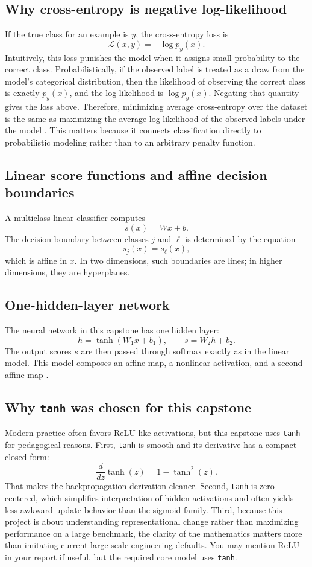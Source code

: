 \documentclass[11pt]{article}
\begin{document}
\subsection{Why cross-entropy is negative log-likelihood}

If the true class for an example is $y$, the cross-entropy loss is
\[
\mathcal{L}(x,y) = -\log p_y(x).
\]
Intuitively, this loss punishes the model when it assigns small probability to the correct class. Probabilistically, if the observed label is treated as a draw from the model's categorical distribution, then the likelihood of observing the correct class is exactly $p_y(x)$, and the log-likelihood is $\log p_y(x)$. Negating that quantity gives the loss above. Therefore, minimizing average cross-entropy over the dataset is the same as maximizing the average log-likelihood of the observed labels under the model \cite{murphy2022,ngdeep}. This matters because it connects classification directly to probabilistic modeling rather than to an arbitrary penalty function.

\subsection{Linear score functions and affine decision boundaries}

A multiclass linear classifier computes
\[
s(x)=Wx+b.
\]
The decision boundary between classes $j$ and $\ell$ is determined by the equation
\[
s_j(x)=s_\ell(x),
\]
which is affine in $x$. In two dimensions, such boundaries are lines; in higher dimensions, they are hyperplanes.

\subsection{One-hidden-layer network}

The neural network in this capstone has one hidden layer:
\[
h = \tanh(W_1 x + b_1), \qquad s = W_2 h + b_2.
\]
The output scores $s$ are then passed through softmax exactly as in the linear model. This model composes an affine map, a nonlinear activation, and a second affine map \cite{goodfellow2016,cs231n_nn,ethml2024}.

\subsection{Why \texttt{tanh} was chosen for this capstone}

Modern practice often favors ReLU-like activations, but this capstone uses \verb|tanh| for pedagogical reasons. First, \verb|tanh| is smooth and its derivative has a compact closed form:
\[
\frac{d}{dz}\tanh(z)=1-\tanh^2(z).
\]
That makes the backpropagation derivation cleaner. Second, \verb|tanh| is zero-centered, which simplifies interpretation of hidden activations and often yields less awkward update behavior than the sigmoid family. Third, because this project is about understanding representational change rather than maximizing performance on a large benchmark, the clarity of the mathematics matters more than imitating current large-scale engineering defaults. You may mention ReLU in your report if useful, but the required core model uses \verb|tanh|.
\end{document}
